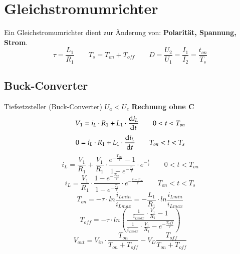 \section{Gleichstromumrichter}
Ein Gleichstromumrichter dient zur Änderung von: \textbf{Polarität, Spannung, Strom}.\newline
\[ \tau=\frac{L_1}{R_1} \qquad T_s=T_{on} + T_{off} \qquad  D = \frac{U_2}{U_1}=\frac{I_1}{I_2}=\frac{t_{on}}{T_s} \]
\subsection{Buck-Converter}
\begin{minipage}{0.75\linewidth}
    Tiefsetzsteller (Buck-Converter) $U_a < U_e  $\newline
    \textbf{Rechnung ohne C}\newline
    \[ V_1 = i_L\cdot R_1+L_1\cdot\frac{\mathop{}\!\mathrm{d} i_L}{\mathop{}\!\mathrm{d} t} \qquad 0<t<T_{on} \]
    \[ 0 = i_L\cdot R_1+L_1\cdot\frac{\mathop{}\!\mathrm{d} i_L}{\mathop{}\!\mathrm{d} t} \qquad T_{on}<t<T_{s} \]    
    \[ i_L=\frac{V_1}{R_1}+ \frac{V_1}{R_1}\cdot \frac{e^{-\frac{T_{off}}{\tau}}-1}{1-e^{-\frac{T_{s}}{\tau}}}\cdot e^{-\frac{t}{\tau}} \qquad 0<t<T_{on}  \]
    \[ i_L=\frac{V_1}{R_1}\cdot \frac{1-e^{-\frac{T_{on}}{\tau}}}{1-e^{-\frac{T_{s}}{\tau}}}\cdot e^{-\frac{t-T_{on}}{\tau}} \qquad T_{on}<t<T_{s}  \]    
    \[ T_{on}=-\tau \cdot ln\frac{i_{Lmin}}{i_{Lmax}}= -\frac{L_1}{R_1}\cdot ln\frac{i_{Lmin}}{i_{Lmax}} \]    
    \[ T_{off}=-\tau \cdot ln\left(\frac{\frac{1}{i_{Lmax}}\cdot\frac{V_1}{R_1}-1}{\frac{1}{i_{Lmax}}\cdot \frac{V_1}{R_1}-e^{-\frac{T_off}{\tau}}}\right) \]
    \[ V_{out}=V_{in}\cdot \frac{T_{on}}{T_{on}+T_{off}}-V_D\frac{T_{off}}{T_{on}+T_{off}} \]
\end{minipage}
